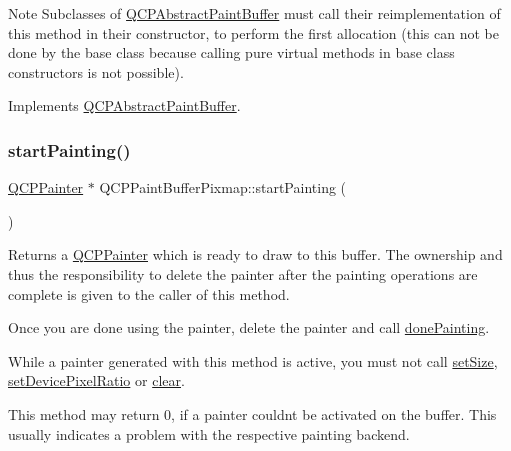 \begin{DoxyNote}{Note}
Subclasses of \mbox{\hyperlink{class_q_c_p_abstract_paint_buffer}{Q\+C\+P\+Abstract\+Paint\+Buffer}} must call their reimplementation of this method in their constructor, to perform the first allocation (this can not be done by the base class because calling pure virtual methods in base class constructors is not possible). 
\end{DoxyNote}


Implements \mbox{\hyperlink{class_q_c_p_abstract_paint_buffer_aee7506a52bd7e5a07c2af27935eb13e7}{Q\+C\+P\+Abstract\+Paint\+Buffer}}.

\mbox{\label{class_q_c_p_paint_buffer_pixmap_a357964ef7d28cfa530338be4e5c93234}} 
\subsubsection{\texorpdfstring{startPainting()}{startPainting()}}
{\footnotesize\ttfamily \mbox{\hyperlink{class_q_c_p_painter}{Q\+C\+P\+Painter}} $\ast$ Q\+C\+P\+Paint\+Buffer\+Pixmap\+::start\+Painting (\begin{DoxyParamCaption}{ }\end{DoxyParamCaption})\hspace{0.3cm}{\ttfamily [virtual]}}

Returns a \mbox{\hyperlink{class_q_c_p_painter}{Q\+C\+P\+Painter}} which is ready to draw to this buffer. The ownership and thus the responsibility to delete the painter after the painting operations are complete is given to the caller of this method.

Once you are done using the painter, delete the painter and call \mbox{\hyperlink{class_q_c_p_abstract_paint_buffer_a41b0dc6e7744f19fae09f8532c207dc1}{done\+Painting}}.

While a painter generated with this method is active, you must not call \mbox{\hyperlink{class_q_c_p_abstract_paint_buffer_a8b68c3cd36533f1a4a23b5ce8cd66f01}{set\+Size}}, \mbox{\hyperlink{class_q_c_p_abstract_paint_buffer_a555eaad5d5c806420ff35602a1bb68fa}{set\+Device\+Pixel\+Ratio}} or \mbox{\hyperlink{class_q_c_p_paint_buffer_pixmap_a14badbd010a3cde6b55817ccb7b65217}{clear}}.

This method may return 0, if a painter couldn\textquotesingle{}t be activated on the buffer. This usually indicates a problem with the respective painting backend. 


